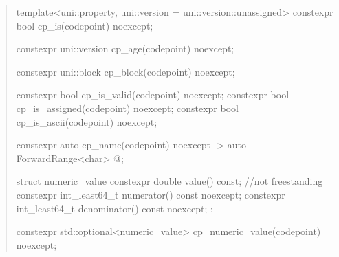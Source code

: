 \documentclass{wg21}
\begin{document}
\begin{quote}
\begin{codeblock}
{template<uni::property, uni::version = uni::version::unassigned>
constexpr bool cp_is(codepoint) noexcept;

constexpr uni::version cp_age(codepoint) noexcept;

constexpr uni::block cp_block(codepoint) noexcept;

constexpr bool cp_is_valid(codepoint) noexcept;
constexpr bool cp_is_assigned(codepoint) noexcept;
constexpr bool cp_is_ascii(codepoint) noexcept;

constexpr auto cp_name(codepoint) noexcept
    -> auto ForwardRange<char> @\seebelow@;


struct numeric_value {
    constexpr double value() const; //not freestanding
    constexpr int_least64_t numerator() const noexcept;
    constexpr int_least64_t denominator() const noexcept;
};

constexpr std::optional<numeric_value>
cp_numeric_value(codepoint) noexcept;

}

\end{codeblock}
\end{quote}
\end{document}
